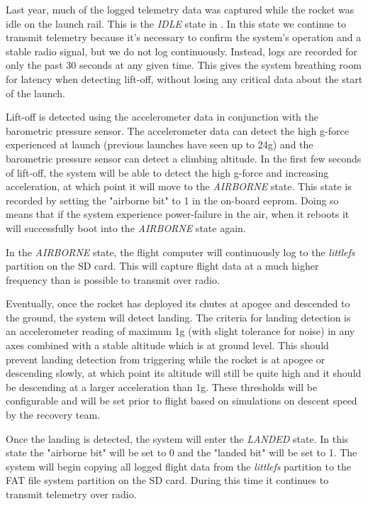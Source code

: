 Last year, much of the logged telemetry data was captured while the rocket was idle on the launch rail. This is the
\textit{IDLE} state in . In this state we continue to transmit telemetry because it's necessary
to confirm the system's operation and a stable radio signal, but we do not log continuously. Instead, logs are recorded
for only the past 30 seconds at any given time. This gives the system breathing room for latency when detecting
lift-off, without losing any critical data about the start of the launch.

Lift-off is detected using the accelerometer data in conjunction with the barometric pressure sensor. The accelerometer
data can detect the high g-force experienced at launch (previous launches have seen up to 24g) and the barometric
pressure sensor can detect a climbing altitude. In the first few seconds of lift-off, the system will be able to detect
the high g-force and increasing acceleration, at which point it will move to the \textit{AIRBORNE} state. This state is
recorded by setting the "airborne bit" to 1 in the on-board \gls{eeprom}. Doing so means that if the system experience
power-failure in the air, when it reboots it will successfully boot into the \textit{AIRBORNE} state again.

In the \textit{AIRBORNE} state, the flight computer will continuously log to the \textit{littlefs} partition on the SD
card. This will capture flight data at a much higher frequency than is possible to transmit over radio.

Eventually, once the rocket has deployed its chutes at apogee and descended to the ground, the system will detect
landing. The criteria for landing detection is an accelerometer reading of maximum 1g (with slight tolerance for noise)
in any axes combined with a stable altitude which is at ground level. This should prevent landing detection from
triggering while the rocket is at apogee or descending slowly, at which point its altitude will still be quite high and
it should be descending at a larger acceleration than 1g. These thresholds will be configurable and will be set prior
to flight based on simulations on descent speed by the recovery team.

Once the landing is detected, the system will enter the \textit{LANDED} state. In this state the "airborne bit" will be
set to 0 and the "landed bit" will be set to 1. The system will begin copying all logged flight data from the
\textit{littlefs} partition to the FAT file system partition on the SD card. During this time it continues to transmit
telemetry over radio.

